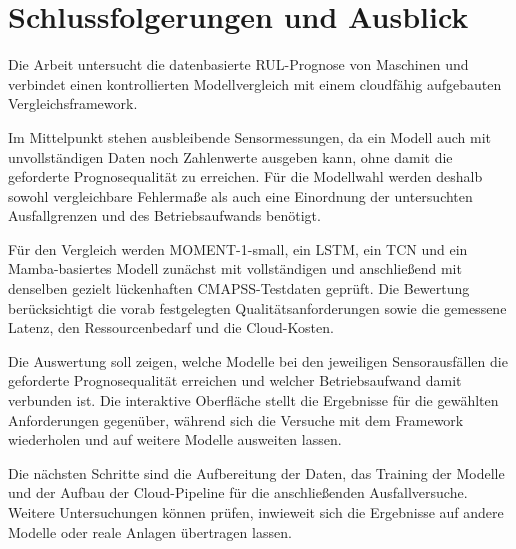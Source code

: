 
\newpage
\chapter{Schlussfolgerungen und Ausblick}

Die Arbeit untersucht die datenbasierte \ac{RUL}-Prognose von Maschinen und verbindet einen kontrollierten Modellvergleich mit einem cloudfähig aufgebauten Vergleichsframework.

Im Mittelpunkt stehen ausbleibende Sensormessungen, da ein Modell auch mit unvollständigen Daten noch Zahlenwerte ausgeben kann, ohne damit die geforderte Prognosequalität zu erreichen. Für die Modellwahl werden deshalb sowohl vergleichbare Fehlermaße als auch eine Einordnung der untersuchten Ausfallgrenzen und des Betriebsaufwands benötigt.

Für den Vergleich werden MOMENT-1-small, ein \ac{LSTM}, ein \ac{TCN} und ein Mamba-basiertes Modell zunächst mit vollständigen und anschließend mit denselben gezielt lückenhaften \ac{CMAPSS}-Testdaten geprüft. Die Bewertung berücksichtigt die vorab festgelegten Qualitätsanforderungen sowie die gemessene Latenz, den Ressourcenbedarf und die Cloud-Kosten.

Die Auswertung soll zeigen, welche Modelle bei den jeweiligen Sensorausfällen die geforderte Prognosequalität erreichen und welcher Betriebsaufwand damit verbunden ist. Die interaktive Oberfläche stellt die Ergebnisse für die gewählten Anforderungen gegenüber, während sich die Versuche mit dem Framework wiederholen und auf weitere Modelle ausweiten lassen.

Die nächsten Schritte sind die Aufbereitung der Daten, das Training der Modelle und der Aufbau der Cloud-Pipeline für die anschließenden Ausfallversuche. Weitere Untersuchungen können prüfen, inwieweit sich die Ergebnisse auf andere Modelle oder reale Anlagen übertragen lassen.
